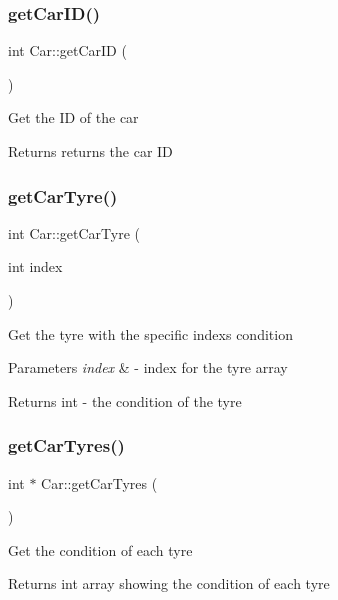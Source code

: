 \subsubsection{\texorpdfstring{get\+Car\+I\+D()}{getCarID()}}
{\footnotesize\ttfamily int Car\+::get\+Car\+ID (\begin{DoxyParamCaption}{ }\end{DoxyParamCaption})\hspace{0.3cm}{\ttfamily [inline]}}

Get the ID of the car \begin{DoxyReturn}{Returns}
returns the car ID 
\end{DoxyReturn}
\mbox{\label{class_car_aa025fcec65db2ad7d696840e64c9451c}} 
\subsubsection{\texorpdfstring{get\+Car\+Tyre()}{getCarTyre()}}
{\footnotesize\ttfamily int Car\+::get\+Car\+Tyre (\begin{DoxyParamCaption}\item[{int}]{index }\end{DoxyParamCaption})}

Get the tyre with the specific index\textquotesingle{}s condition 
\begin{DoxyParams}{Parameters}
{\em index} & -\/ index for the tyre array \\
\hline
\end{DoxyParams}
\begin{DoxyReturn}{Returns}
int -\/ the condition of the tyre 
\end{DoxyReturn}
\mbox{\label{class_car_aabb17902a6b0770523779bd2d1ab9fdd}} 
\subsubsection{\texorpdfstring{get\+Car\+Tyres()}{getCarTyres()}}
{\footnotesize\ttfamily int $\ast$ Car\+::get\+Car\+Tyres (\begin{DoxyParamCaption}{ }\end{DoxyParamCaption})}

Get the condition of each tyre \begin{DoxyReturn}{Returns}
int array showing the condition of each tyre 
\end{DoxyReturn}
\mbox{\label{class_car_aa9255a0bd2fdb42948fea897b13d574f}} 

